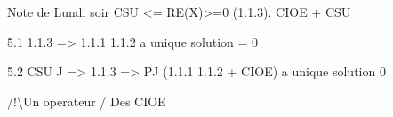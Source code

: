        \begin{REM}
            Note de Lundi soir
            CSU <= RE(X)>=0 (1.1.3). CIOE + CSU

            5.1 1.1.3 => 1.1.1 1.1.2 a  unique solution = 0

            5.2 CSU J => 1.1.3 => PJ (1.1.1 1.1.2 + CIOE) a unique solution 0

            /!\textbackslash  Un operateur / Des CIOE
        \end{REM}


% 
